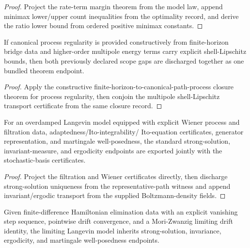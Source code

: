 \begin{proof}
Project the rate-term margin theorem from the model law, append minimax lower/upper count inequalities from the optimality record, and derive the ratio lower bound from ordered positive minimax constants.
\end{proof}

\begin{theorem}\label{thm:constructive-stochastic-multipole-scope-discharge}
If canonical process regularity is provided constructively from finite-horizon bridge data and higher-order multipole energy terms carry explicit shell-Lipschitz bounds, then both previously declared scope gaps are discharged together as one bundled theorem endpoint.
\end{theorem}

\begin{proof}
Apply the constructive finite-horizon-to-canonical-path-process closure theorem for process regularity, then conjoin the multipole shell-Lipschitz transport certificate from the same closure record.
\end{proof}

\begin{theorem}\label{thm:ito-wiener-filtration-langevin-endpoints}
For an overdamped Langevin model equipped with explicit Wiener process and filtration data, adaptedness/Ito-integrability/ Ito-equation certificates, generator representation, and martingale well-posedness, the standard strong-solution, invariant-measure, and ergodicity endpoints are exported jointly with the stochastic-basis certificates.
\end{theorem}

\begin{proof}
Project the filtration and Wiener certificates directly, then discharge strong-solution uniqueness from the representative-path witness and append invariant/ergodic transport from the supplied Boltzmann-density fields.
\end{proof}

\begin{theorem}\label{thm:hamiltonian-mori-zwanzig-h-zero-limit-endpoints}
Given finite-difference Hamiltonian elimination data with an explicit vanishing step sequence, pointwise drift convergence, and a Mori-Zwanzig limiting drift identity, the limiting Langevin model inherits strong-solution, invariance, ergodicity, and martingale well-posedness endpoints.
\end{theorem}


